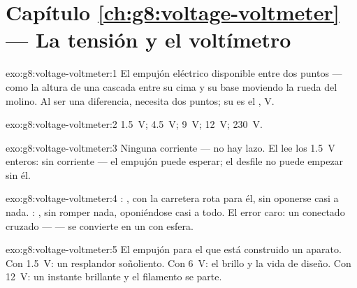 \section*{Capítulo \ref{ch:g8:voltage-voltmeter} --- La tensión y el voltímetro}

\begin{solution}{exo:g8:voltage-voltmeter:1}
El empujón eléctrico disponible entre dos puntos --- como la altura de
una cascada entre su cima y su base moviendo la rueda del molino. Al
ser una diferencia, necesita dos puntos; su  es el
, \unit{V}.
\end{solution}

\begin{solution}{exo:g8:voltage-voltmeter:2}
\qty{1.5}{V}; \qty{4.5}{V}; \qty{9}{V}; \qty{12}{V}; \qty{230}{V}.
\end{solution}

\begin{solution}{exo:g8:voltage-voltmeter:3}
Ninguna corriente --- no hay lazo. El  lee los
\qty{1.5}{V} enteros:  sin corriente --- el empujón puede
esperar; el desfile no puede empezar sin él.
\end{solution}

\begin{solution}{exo:g8:voltage-voltmeter:4}
: , con la carretera rota para él, sin
oponerse casi a nada. : , sin
romper nada, oponiéndose casi a todo. El error caro: un
 conectado cruzado ---  --- se
convierte en un  con esfera.
\end{solution}

\begin{solution}{exo:g8:voltage-voltmeter:5}
El empujón para el que está construido un aparato. Con \qty{1.5}{V}: un
resplandor soñoliento. Con \qty{6}{V}: el brillo y la vida de diseño.
Con \qty{12}{V}: un instante brillante y el filamento se parte.
\end{solution}

